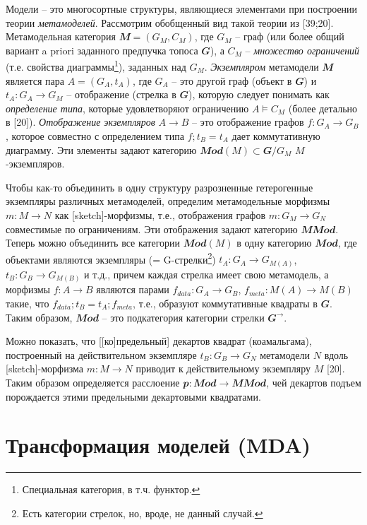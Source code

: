 \documentclass[12pt,a4paper]{ltxdoc}
\begin{document}
Модели -- это многосортные структуры, являющиеся элементами при построении теории \emph{метамоделей}.  Рассмотрим обобщенный вид такой теории из [39;20].  Метамодельная категория $\mathbfit{M}=(G_M,C_M)$, где $G_M$ -- граф (или более общий вариант a priori заданного предпучка топоса $\mathbfit{G}$), а $C_M$ -- \emph{множество ограничений} (т.е. свойства диаграммы\footnote{Специальная категория, в т.ч. функтор.}), заданных над $G_M$.  \emph{Экземпляром} метамодели $\mathbfit{M}$ является пара $A = (G_A, t_A)$, где $G_A$ -- это другой граф (объект в $\mathbfit{G}$) и $t_A: G_A \to G_M$ -- отображение (стрелка в $\mathbfit{G}$), которую следует понимать как \emph{определение типа}, которые удовлетворяют ограничению $A \models C_M$ (более детально в [20]).  \emph{Отображение экземпляров} $A\to B$ -- это отображение графов $f: G_A\to G_B$, которое совместно с определением типа $f;t_B = t_A$ дает коммутативную диаграмму.  Эти элементы задают категорию $\mathbfit{Mod}(M) \subset \mathbfit{G}/G_M$ $M$-экземпляров.

Чтобы как-то объединить в одну структуру разрозненные гетерогенные экземпляры различных метамоделей, определим метамодельные морфизмы $m: M\to N$ как [sketch]-морфизмы, т.е., отображения графов $m: G_M\to G_N$ совместимые по ограничениям.  Эти отображения задают категорию $\mathbfit{MMod}$.  Теперь можно объединить все категории $\mathbfit{Mod}(M)$ в одну категорию $\mathbfit{Mod}$, где объектами являются экземпляры (= G-стрелки\footnote{Есть категории стрелок, но, вроде, не данный случай.}) $t_A: G_A\to G_{M(A)}$, $t_B: G_B\to G_{M(B)}$ и т.д., причем каждая стрелка имеет свою метамодель, а морфизмы $f:A\to B$ являются парами $f_{data}: G_A\to G_B$, $f_{meta}: M(A) \to M(B)$ такие, что $f_{data};t_B = t_A; f_{meta}$, т.е., образуют коммутативные квадраты в $\mathbfit{G}$.  Таким образом, $\mathbfit{Mod}$ -- это подкатегория категории стрелки $\mathbfit{G}^{\to}$.

Можно показать, что [[ко]предельный] декартов квадрат (коамальгама), построенный на действительном экземпляре $t_B: G_B\to G_N$ метамодели $N$ вдоль [sketch]-морфизма $m:M\to N$ приводит к действительному экземпляру $M$ [20].  Таким образом определяется расслоение $\mathbfit{p} : \mathbfit{Mod} \to \mathbfit{MMod}$, чей декартов подъем порождается этими предельными декартовыми квадратами.

\section{Трансформация моделей (MDA)}
\label{sec:mda-transform}
\end{document}
